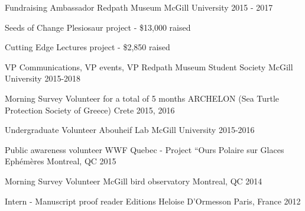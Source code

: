 

\begin{cventries}

  \cventry
    {Fundraising Ambassador} %
    {Redpath Museum} %
    {McGill University} %
    {2015 - 2017} %
    {
      \begin{cvitems} %
        \item {Seeds of Change Plesiosaur project - \$13,000 raised}
        \item {Cutting Edge Lectures project - \$2,850 raised}
      \end{cvitems}
    }

  \cventry
    {VP Communications, VP events, VP} %
    {Redpath Museum Student Society} %
    {McGill University} %
    {2015-2018} %
    {}

  \vspace{-8pt}
  \cventry
    {Morning Survey Volunteer for a total of 5 months} %
    {ARCHELON (Sea Turtle Protection Society of Greece)} %
    {Crete} %
    {2015, 2016} %
    {}

  \vspace{-8pt}
  \cventry
    {Undergraduate Volunteer} %
    {Abouheif Lab} %
    {McGill University} %
    {2015-2016} %
    {}

  \vspace{-8pt}
  \cventry
    {Public awareness volunteer} %
    {WWF Quebec - Project “Ours Polaire sur Glaces Ephémères} %
    {Montreal, QC} %
    {2015} %
    {}

  \vspace{-8pt}
  \cventry
    {Morning Survey Volunteer} %
    {McGill bird observatory} %
    {Montreal, QC} %
    {2014} %
    {}

  \vspace{-8pt}
  \cventry
    {Intern - Manuscript proof reader} %
    {Editions Heloise D’Ormesson} %
    {Paris, France} %
    {2012} %
    {}

\end{cventries}
\vspace{-12pt}